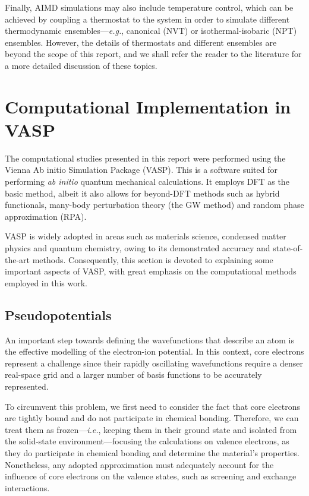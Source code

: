Finally, AIMD simulations may also include temperature control, which can be achieved by coupling a thermostat to the system in order to simulate different thermodynamic ensembles---\emph{e.g.}, canonical (NVT) or isothermal-isobaric (NPT) ensembles.
However, the details of thermostats and different ensembles are beyond the scope of this report, and we shall refer the reader to the literature\supercite{tuckerman2023statistical,frenkel2023understanding} for a more detailed discussion of these topics.

\section{Computational Implementation in VASP}
The computational studies presented in this report were performed using the Vienna Ab initio Simulation Package (VASP). This is a software suited for performing \emph{ab initio} quantum mechanical calculations\supercite{https://doi.org/10.1002/jcc.21057}. It employs DFT as the basic method, albeit it also allows for beyond-DFT methods such as hybrid functionals, many-body perturbation theory (the GW method) and random phase approximation (RPA). 

VASP is widely adopted in areas such as materials science, condensed matter physics and quantum chemistry, owing to its demonstrated accuracy and state-of-the-art methods. Consequently, this section is devoted to explaining some important aspects of VASP, with great emphasis on the computational methods employed in this work. 

\subsection{Pseudopotentials}
An important step towards defining the wavefunctions that describe an atom is the effective modelling of the electron-ion potential. In this context, core electrons represent a challenge since their rapidly oscillating wavefunctions require a denser real-space grid and a larger number of basis functions to be accurately represented.

To circumvent this problem, we first need to consider the fact that core electrons are tightly bound and do not participate in chemical bonding. Therefore, we can treat them as frozen---\emph{i.e.}, keeping them in their ground state and isolated from the solid-state environment---focusing the calculations on valence electrons, as they do participate in chemical bonding and determine the material's properties. Nonetheless, any adopted approximation must adequately account for the influence of core electrons on the valence states, such as screening and exchange interactions.

